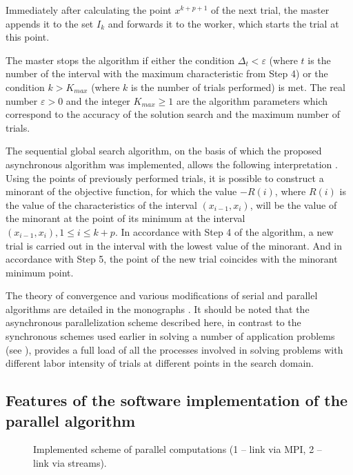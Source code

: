 \documentclass[mathematics,article,submit,pdftex,moreauthors]{Definitions/mdpi}
\begin{document}
Immediately after calculating the point $x^{k+p+1}$ of the next trial, the master appends it to the set $I_k$ and forwards it to the worker, which starts the trial at this point. 

The master stops the algorithm if either the condition $\Delta_{t}<\varepsilon$ (\textcolor[rgb]{1,0,0}{where $t$ is the number} of the interval with the maximum characteristic from Step 4) or the condition $k>K_{max}$ (where $k$ is the number of trials performed) is met.
The real number $\varepsilon>0$ and the integer $K_{max} \geq 1$ are the algorithm parameters which correspond to the accuracy of the solution search and the maximum number of trials.

The sequential global search algorithm, on the basis of which the proposed asynchronous algorithm was implemented, allows the following interpretation \cite{Molinaro2001}. Using the points of previously performed trials, it is possible to construct a minorant of the objective function, for which the value $-R(i)$, where $R(i)$ is the value of the \textcolor[rgb]{1,0,0}{characteristics} of the interval $(x_{i-1}, x_i)$, will be the value of the minorant at the point of its minimum at the interval $(x_{i-1},x_i), 1\leq i\leq k+p$. In accordance with Step 4 of the algorithm, a new trial is carried out in the interval with the lowest value of the minorant. And in accordance with Step 5, the point of the new trial coincides with the minorant minimum point.

The theory of convergence and various modifications of serial and parallel algorithms are detailed in the monographs \cite{Strongin2000,Sergeyev2017}. 
It should be noted that the asynchronous parallelization scheme described here, in contrast to the synchronous schemes used earlier in solving a number of application problems (see \cite{Kalyulin2017, Modorskii2016}), provides a full load of all the processes involved in solving problems with different labor intensity of trials at different points in the search domain.


\subsection{Features of the software implementation of the parallel algorithm}

\begin{figure}
\caption{Implemented scheme of parallel computations (1 -- link via MPI, 2 -- link via streams).}\label{fig:Impl}
\end{figure}   
\end{document}
